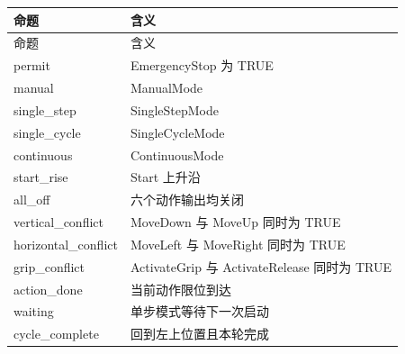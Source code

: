 \begin{longtable}{L{3.3cm}L{10.0cm}}

\toprule

命题 & 含义\\

\midrule

\endfirsthead

\toprule

命题 & 含义\\

\midrule

\endhead

{\ttfamily permit} & EmergencyStop 为 TRUE\\

{\ttfamily manual} & ManualMode\\

{\ttfamily single\_step} & SingleStepMode\\

{\ttfamily single\_cycle} & SingleCycleMode\\

{\ttfamily continuous} & ContinuousMode\\

{\ttfamily start\_rise} & Start 上升沿\\

{\ttfamily all\_off} & 六个动作输出均关闭\\

{\ttfamily vertical\_conflict} & MoveDown 与 MoveUp 同时为 TRUE\\

{\ttfamily horizontal\_conflict} & MoveLeft 与 MoveRight 同时为 TRUE\\

{\ttfamily grip\_conflict} & ActivateGrip 与 ActivateRelease 同时为 TRUE\\

{\ttfamily action\_done} & 当前动作限位到达\\

{\ttfamily waiting} & 单步模式等待下一次启动\\

{\ttfamily cycle\_complete} & 回到左上位置且本轮完成\\

\bottomrule

\end{longtable}

